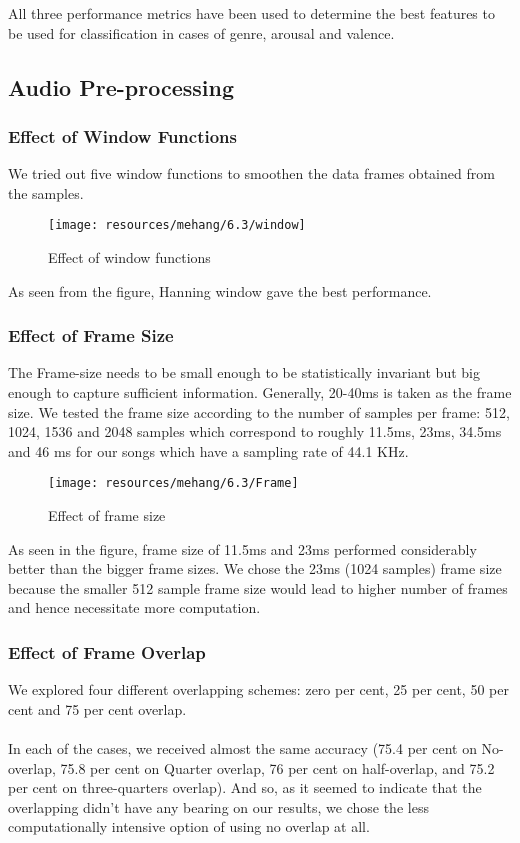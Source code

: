         All three performance metrics have been used to determine the best features to be used for classification in cases of genre, arousal and valence.

\newpage
\subsection{Audio Pre-processing}
\subsubsection{Effect of Window Functions}
We tried out five window functions to smoothen the data frames obtained from the samples. 

\begin{figure}[h!]
        \centering
        \texttt{[image: resources/mehang/6.3/window]}
        \caption{Effect of window functions}
\end{figure}

As seen from the figure, Hanning window gave the best performance. 

\subsubsection{Effect of Frame Size}
The Frame-size needs to be small enough to be statistically invariant but big enough to capture sufficient information. Generally, 20-40ms is taken as the frame size. We tested the frame size according to the number of samples per frame: 512, 1024, 1536 and 2048 samples which correspond to roughly 11.5ms, 23ms, 34.5ms and 46 ms for our songs which have a sampling rate of 44.1 KHz.

\begin{figure}[h!]
        \centering
        \texttt{[image: resources/mehang/6.3/Frame]}
        \caption{Effect of frame size}
\end{figure}

As seen in the figure, frame size of 11.5ms and 23ms performed considerably better than the bigger frame sizes. We chose the 23ms (1024 samples) frame size because the smaller 512 sample frame size would lead to higher number of frames and hence necessitate more computation.

\newpage
\subsubsection{Effect of Frame Overlap}
We explored four different overlapping schemes: zero per cent, 25 per cent, 50 per cent and 75 per cent overlap.\\
\\
In each of the cases, we received almost the same accuracy (75.4 per cent on No-overlap, 75.8 per cent on Quarter overlap, 76 per cent on half-overlap, and 75.2 per cent on three-quarters overlap). And so, as it seemed to indicate that the overlapping didn’t have any bearing on our results, we chose the less computationally intensive option of using no overlap at all. 

